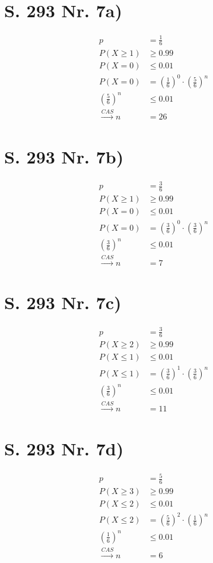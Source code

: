 \documentclass[12pt,a4paper]{report}
\begin{document}
	\section{S. 293 Nr. 7a)}
	\begin{align*}
		p &= \frac{1}{6} \\
		P(X \geq 1) &\geq 0.99 \\
		P(X = 0) &\leq 0.01 \\
		P(X = 0) &= (\frac{1}{6})^0 \cdot (\frac{5}{6})^n \\
		(\frac{5}{6})^n &\leq 0.01 \\
		\xrightarrow{CAS} n &= 26
	\end{align*}
	\section{S. 293 Nr. 7b)}
	\begin{align*}
		p &= \frac{3}{6} \\
		P(X \geq 1) &\geq 0.99 \\
		P(X = 0) &\leq 0.01 \\
		P(X = 0) &= (\frac{3}{6})^0 \cdot (\frac{3}{6})^n \\
		(\frac{3}{6})^n &\leq 0.01 \\
		\xrightarrow{CAS} n &= 7
	\end{align*}
	\section{S. 293 Nr. 7c)}
	\begin{align*}
		p &= \frac{3}{6} \\
		P(X \geq 2) &\geq 0.99 \\
		P(X \leq 1) &\leq 0.01 \\
		P(X \leq 1) &= (\frac{3}{6})^1 \cdot (\frac{3}{6})^n \\
		(\frac{3}{6})^n &\leq 0.01 \\
		\xrightarrow{CAS} n &= 11
	\end{align*}
	\section{S. 293 Nr. 7d)}
	\begin{align*}
		p &= \frac{5}{6} \\
		P(X \geq 3) &\geq 0.99 \\
		P(X \leq 2) &\leq 0.01 \\
		P(X \leq 2) &= (\frac{5}{6})^2 \cdot (\frac{1}{6})^n \\
		(\frac{1}{6})^n &\leq 0.01 \\
		\xrightarrow{CAS} n &= 6
	\end{align*}
\end{document}
